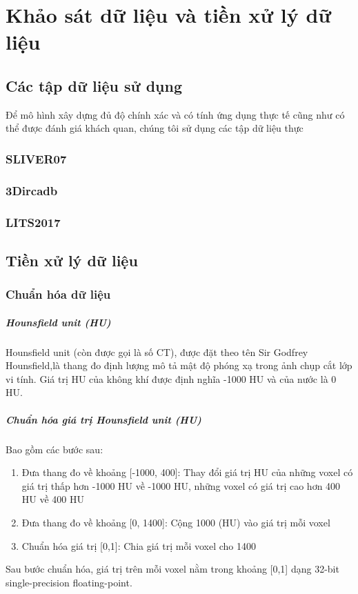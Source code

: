 \chapter{Khảo sát dữ liệu và tiền xử lý dữ liệu}
\section{Các tập dữ liệu sử dụng}
Để mô hình xây dựng đủ độ chính xác và có tính ứng dụng thực tế cũng như có thể được đánh giá khách quan, chúng tôi sử dụng các tập dữ liệu thực 
\subsection{SLIVER07}
\subsection{3Dircadb}
\subsection{LITS2017}
\section{Tiền xử lý dữ liệu}
\subsection{Chuẩn hóa dữ liệu}
\paragraph{Hounsfield unit (HU)} Hounsfield unit (còn được gọi là số CT), được đặt theo tên Sir Godfrey Hounsfield,là thang đo định lượng mô tả mật độ phóng xạ trong ảnh chụp cắt lớp vi tính. Giá trị HU của không khí được định nghĩa -1000 HU và của nước là 0 HU.
\paragraph{Chuẩn hóa giá trị Hounsfield unit (HU)} Bao gồm các bước sau:
\begin{enumerate}
\item Đưa thang đo về khoảng [-1000, 400]: Thay đổi giá trị HU của những voxel có giá trị thấp hơn -1000 HU về -1000 HU, những voxel có giá trị cao hơn 400 HU về 400 HU
\item Đưa thang đo về khoảng [0, 1400]: Cộng 1000 (HU) vào giá trị mỗi voxel
\item Chuẩn hóa giá trị [0,1]: Chia giá trị mỗi voxel cho 1400
\end{enumerate}
Sau bước chuẩn hóa, giá trị trên mỗi voxel nằm trong khoảng [0,1] dạng 32-bit single-precision floating-point.

